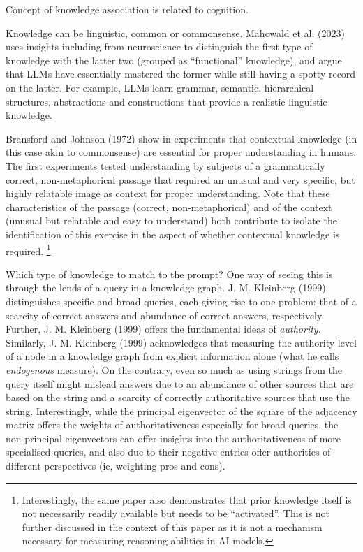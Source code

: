 \documentclass[
]{article}
\begin{document}
Concept of knowledge association is related to cognition.

Knowledge can be linguistic, common or commonsense. Mahowald et al.
(2023) uses insights including from neuroscience to distinguish the
first type of knowledge with the latter two (grouped as ``functional''
knowledge), and argue that LLMs have essentially mastered the former
while still having a spotty record on the latter. For example, LLMs
learn grammar, semantic, hierarchical structures, abstractions and
constructions that provide a realistic linguistic knowledge.

Bransford and Johnson (1972) show in experiments that contextual
knowledge (in this case akin to commonsense) are essential for proper
understanding in humans. The first experiments tested understanding by
subjects of a grammatically correct, non-metaphorical passage that
required an unusual and very specific, but highly relatable image as
context for proper understanding. Note that these characteristics of the
passage (correct, non-metaphorical) and of the context (unusual but
relatable and easy to understand) both contribute to isolate the
identification of this exercise in the aspect of whether contextual
knowledge is required. \footnote{Interestingly, the same paper also
  demonstrates that prior knowledge itself is not necessarily readily
  available but needs to be ``activated''. This is not further discussed
  in the context of this paper as it is not a mechanism necessary for
  measuring reasoning abilities in AI models.}

Which type of knowledge to match to the prompt? One way of seeing this
is through the lends of a query in a knowledge graph. J. M. Kleinberg
(1999) distinguishes specific and broad queries, each giving rise to one
problem: that of a scarcity of correct answers and abundance of correct
answers, respectively. Further, J. M. Kleinberg (1999) offers the
fundamental ideas of \emph{authority}. Similarly, J. M. Kleinberg (1999)
acknowledges that measuring the authority level of a node in a knowledge
graph from explicit information alone (what he calls \emph{endogenous}
measure). On the contrary, even so much as using strings from the query
itself might mislead answers due to an abundance of other sources that
are based on the string and a scarcity of correctly authoritative
sources that use the string. Interestingly, while the principal
eigenvector of the square of the adjacency matrix offers the weights of
authoritativeness especially for broad queries, the non-principal
eigenvectors can offer insights into the authoritativeness of more
specialised queries, and also due to their negative entries offer
authorities of different perspectives (ie, weighting pros and cons).
\end{document}
